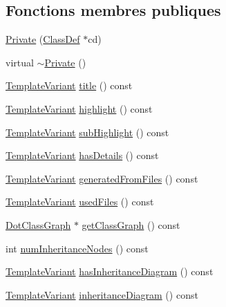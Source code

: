 \subsection*{Fonctions membres publiques}
\begin{DoxyCompactItemize}
\item 
\hyperlink{class_class_context_1_1_private_aa4af906e43ecb186baea35ce137f5e57}{Private} (\hyperlink{class_class_def}{Class\+Def} $\ast$cd)
\item 
virtual \hyperlink{class_class_context_1_1_private_a86311c5298a96cac54f756e1dfe1e763}{$\sim$\+Private} ()
\item 
\hyperlink{class_template_variant}{Template\+Variant} \hyperlink{class_class_context_1_1_private_af2bc1bcede0472711acb270ba1ccddd9}{title} () const 
\item 
\hyperlink{class_template_variant}{Template\+Variant} \hyperlink{class_class_context_1_1_private_afb251cc18a5ba6f339d7d45d9acf9930}{highlight} () const 
\item 
\hyperlink{class_template_variant}{Template\+Variant} \hyperlink{class_class_context_1_1_private_aac18600f392d8d3f070653473ef4fe97}{sub\+Highlight} () const 
\item 
\hyperlink{class_template_variant}{Template\+Variant} \hyperlink{class_class_context_1_1_private_a600bf2d8c56394ae26041f927fb7a934}{has\+Details} () const 
\item 
\hyperlink{class_template_variant}{Template\+Variant} \hyperlink{class_class_context_1_1_private_a5cf9ed5f3f72d93f9b2063f85145ad48}{generated\+From\+Files} () const 
\item 
\hyperlink{class_template_variant}{Template\+Variant} \hyperlink{class_class_context_1_1_private_a05f426377812e63c6dc19146542a7711}{used\+Files} () const 
\item 
\hyperlink{class_dot_class_graph}{Dot\+Class\+Graph} $\ast$ \hyperlink{class_class_context_1_1_private_a7cb0a127af25d1c5db7334e3484916b3}{get\+Class\+Graph} () const 
\item 
int \hyperlink{class_class_context_1_1_private_a28563187f6b59f5ed72f9d20286743a2}{num\+Inheritance\+Nodes} () const 
\item 
\hyperlink{class_template_variant}{Template\+Variant} \hyperlink{class_class_context_1_1_private_a8b321e7fe8e224ef0eeb01fb1bc2ff66}{has\+Inheritance\+Diagram} () const 
\item 
\hyperlink{class_template_variant}{Template\+Variant} \hyperlink{class_class_context_1_1_private_a93b27c8ebaa9318799367b6e2bef2cd5}{inheritance\+Diagram} () const 

\end{DoxyCompactItemize}
